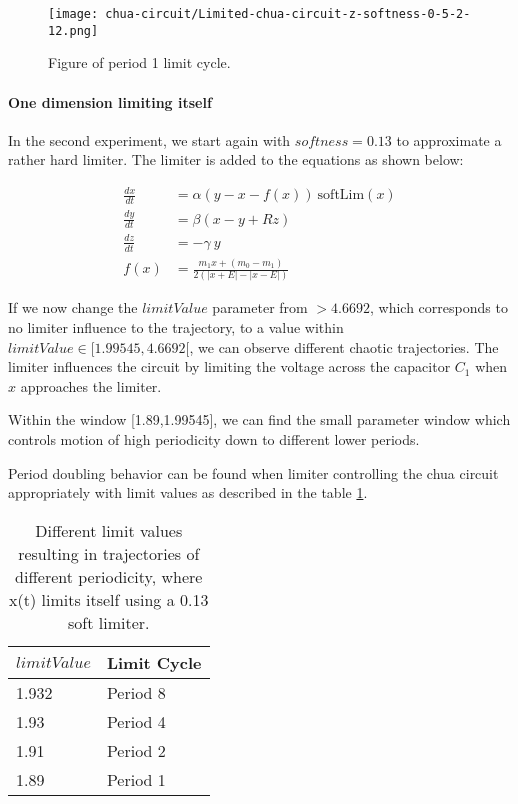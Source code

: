 \documentclass[main]{subfiles}
\begin{document}
\begin{figure}[H]
\centering
\texttt{[image: chua-circuit/Limited-chua-circuit-z-softness-0-5-2-12.png]}
\caption[Figure of period 1 limit cycle.]{Figure of period 1 limit cycle.}
\label{figure:z-0.5-1-limit-cycle-trajectory}
\end{figure}

\paragraph{One dimension limiting itself} In the second experiment, we start again with \(softness=0.13\) to approximate a rather hard limiter. The limiter is added to the equations as shown below:

\begin{align*}
\frac{dx}{dt}&=\alpha (y-x-f(x)) ~ \text{softLim}(x)\\
\frac{dy}{dt}&=\beta (x-y + Rz)\\
\frac{dz}{dt}&=-\gamma ~ y\\
f (x) &= \frac{m_1 x + (m_0 - m_1)}{2 (| x + E | -| x - E |)}
\end{align*}

If we now change the $limitValue$ parameter from \(>4.6692\), which corresponds to no limiter influence to the trajectory, to a value within \(limitValue \in [1.99545,4.6692[\), we can observe different chaotic trajectories. The limiter influences the circuit by limiting the voltage across the capacitor \(C_1\) when \(x\) approaches the limiter.

Within the window [1.89,1.99545], we can find the small parameter window which controls motion of high periodicity down to different lower periods.

Period doubling behavior can be found when limiter controlling the chua circuit appropriately with limit values as described in the table \ref{table:x-0.13-periodicities}.

\begin{table}[H]
\renewcommand{\arraystretch}{1.2}
\center
\begin{tabular}{@{}ll@{}}
	\toprule
   \(limitValue\) & Limit Cycle\\
   \midrule
   1.932 & Period 8 \\ 
   1.93 & Period 4 \\
   1.91  & Period 2 \\
   1.89 & Period 1 \\
   \bottomrule
\end{tabular}
\caption[Limiter values for periodic trajectories for for an x self-limiting limiter with softness 0.13]{Different limit values resulting in trajectories of different periodicity, where x(t) limits itself using a 0.13 soft limiter.}
\label{table:x-0.13-periodicities}
\end{table}
\end{document}

